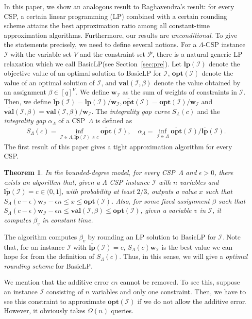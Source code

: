 \documentclass[letterpaper, 11pt]{article}
\newtheorem{theorem}{Theorem}[section]
\newcommand{\calI}{\mathcal{I}}
\newcommand{\calP}{\mathcal{P}}
\newcommand{\biw}{\boldsymbol{w}}
\newcommand{\blp}{\textsf{BasicLP}\xspace}
\newcommand{\lp}{\mathbf{lp}}
\newcommand{\opt}{\mathbf{opt}}
\newcommand{\val}{\mathbf{val}}
\newcommand{\olopt}{\overline{\mathbf{opt}}}
\newcommand{\ollp}{\overline{\mathbf{lp}}}
\newcommand{\olval}{\overline{\mathbf{val}}}
\begin{document}
In this paper, we show an analogous result to Raghavendra's result:
for every CSP,
a certain linear programming (LP) combined with a certain rounding scheme attains the best approximation ratio among all constant-time approximation algorithms.
Furthermore, our results are \textit{unconditional}.
To give the statements precisely, 
we need to define several notions.
For a $\Lambda$-CSP instance $\calI$ with the variable set $V$ and the constraint set $\calP$,
there is a natural generic LP relaxation which we call \blp (see Section~\ref{sec:pre}).
Let $\lp(\calI)$ denote the objective value of an optimal solution to \blp for $\calI$,
$\opt(\calI)$ denote the value of an optimal solution of $\calI$,
and $\val(\calI,\beta)$ denote the value obtained by an assignment $\beta \in [q]^V$.
We define $\biw_{\calI}$ as the sum of weights of constraints in $\calI$.
Then, we define $\ollp(\calI)=\lp(\calI)/\biw_{\calI},\olopt(\calI)=\opt(\calI)/\biw_{\calI}$ and $\olval(\calI,\beta)=\val(\calI,\beta)/\biw_{\calI}$.
The \textit{integrality gap curve} $S_{\Lambda}(c)$ and the \textit{integrality gap} $\alpha_\Lambda$ of a CSP~$\Lambda$ is defined as 
\begin{eqnarray*}
  S_{\Lambda}(c)=\inf_{\calI\in \Lambda, \ollp(\calI) \geq c}\olopt(\calI),\quad \alpha_\Lambda = \inf_{\calI \in \Lambda} \olopt(\calI)/\ollp(\calI).
\end{eqnarray*}
The first result of this paper gives a tight approximation algorithm for every CSP.
\begin{theorem}\label{thr:upper}
  In the bounded-degree model,
  for every CSP~$\Lambda$ and $\epsilon>0$,
  there exists an algorithm that,
  given a $\Lambda$-CSP instance $\calI$ with $n$ variables and $\ollp(\calI)=c \in (0,1]$,
  with probability at least $2/3$,
  outputs a value $x$ such that $S_{\Lambda}(c-\epsilon)\biw_{\calI}-\epsilon n\leq x \leq \opt(\calI)$.
  Also, 
  for some fixed assignment $\beta$ such that $S_{\Lambda}(c-\epsilon)\biw_{\calI}-\epsilon n\leq \val(\calI,\beta) \leq \opt(\calI)$,
  given a variable $v$ in $\calI$,
  it computes $\beta_v$ in constant time.
\end{theorem}
The algorithm computes $\beta_v$ by rounding an LP solution to \blp for $\calI$.
Note that, for an instance $\calI$ with $\ollp(\calI)=c$,
$S_{\Lambda}(c)\biw_{\calI}$ is the best value we can hope for from the definition of $S_{\Lambda}(c)$.
Thus, in this sense, we will give a \textit{optimal rounding scheme} for \blp.

We mention that the additive error $\epsilon n$ cannot be removed.
To see this, 
suppose an instance $\calI$ consisting of $n$ variables and only one constraint.
Then, we have to see this constraint to approximate $\opt(\calI)$ if we do not allow the additive error.
However, it obviously takes $\Omega(n)$ queries.
\end{document}
